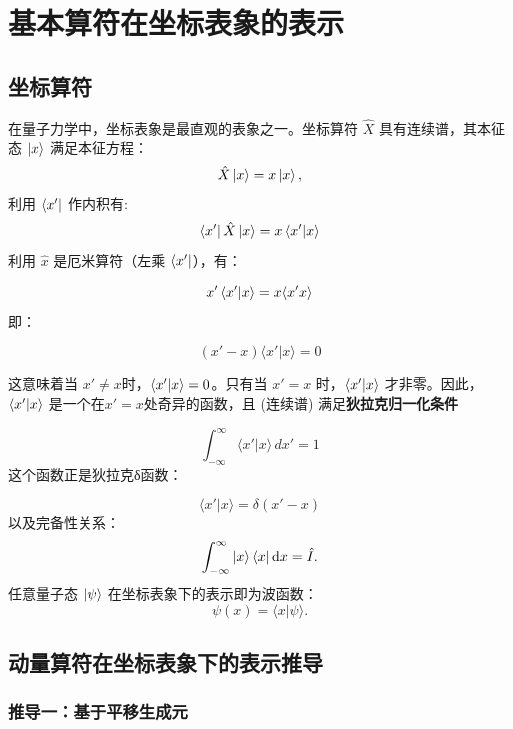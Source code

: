 \section{基本算符在坐标表象的表示}
\subsection{坐标算符}
在量子力学中，坐标表象是最直观的表象之一。坐标算符 $\hat{X}$ 具有连续谱，其本征态 $\ket{x}$ 满足本征方程：
\[
\hat{X} \ket{x} = x \ket{x},
\]
利用 \(\bra{x'}\) 作内积有:
\[
\bra{x'} \hat X\ket{x} = x\bra{x'} \ket{x}
\]
利用 \(\hat{x}\) 是厄米算符（左乘 \(\bra{x'}\)），有：

\[
x' \bra{x'} \ket{x} = x \langle x'
x \rangle
\]
即：

\[
(x' - x) \langle x' | x \rangle = 0
\]

这意味着当 \(x' \neq x \)时，\(\bra{x'} \ket{x} = 0\)。只有当 \(x' = x\) 时，\(\bra{x'} \ket{x}\) 才非零。因此，\(\bra{x'}\ket{x}\) 是一个在\( x' = x \)处奇异的函数，且 (连续谱) 满足\textbf{狄拉克归一化条件}

\[
\int_{-\infty}^{\infty} \langle x' | x \rangle \, dx' = 1
\]
这个函数正是狄拉克δ函数：

\[
\boxed{\langle x' | x \rangle = \delta(x' - x)}
\]
以及完备性关系：
\[
\int_{-\infty}^{\infty} \ket{x} \bra{x}  \dd x = \hat{I}.
\]
任意量子态 $\ket{\psi}$ 在坐标表象下的表示即为波函数：
\[
\psi(x) = \langle x | \psi \rangle.
\]

\subsection{动量算符在坐标表象下的表示推导}

\subsubsection*{推导一：基于平移生成元}

